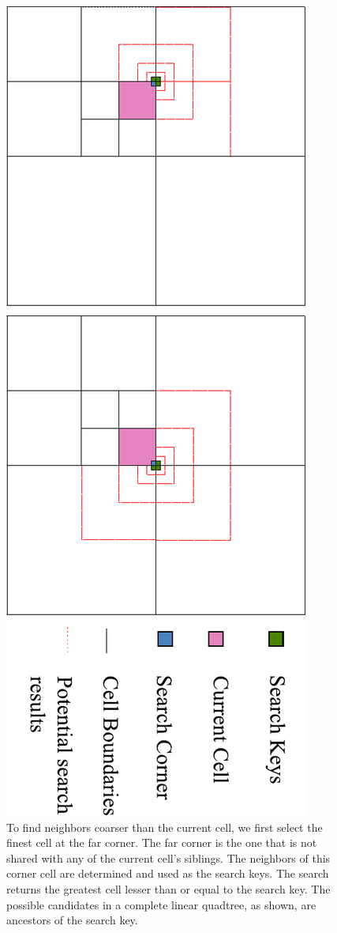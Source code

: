 \begin{figure}
  \begin{center}
    \includegraphics[angle=90, width=\textwidth]{images/searchN}
  \end{center}
  \caption{To find neighbors coarser than the current cell, we first
  select the finest cell at the far corner. The far corner is the one
  that is not shared with any of the current cell's siblings. The
  neighbors of this corner cell are determined and used as the search
  keys. The search returns the greatest cell lesser than or equal to
  the search key. The possible candidates in a complete linear
  quadtree, as shown, are ancestors of the search key.}
  \label{fig:search}
\end{figure}

